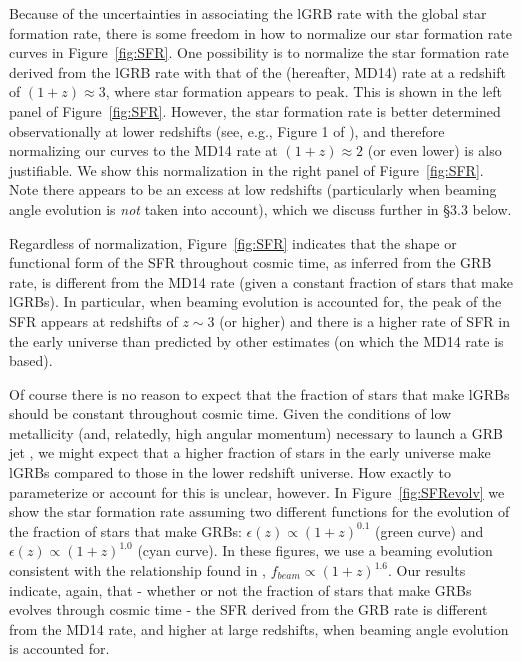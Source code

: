 \documentclass[fleqn,usenatbib,useAMS]{mnras}
\begin{document}
  Because of the uncertainties in associating the lGRB rate with the global star formation rate, there is some freedom in how to normalize our star formation rate curves in Figure~\ref{fig:SFR}. One possibility is to normalize the star formation rate derived from the lGRB rate with that of the \cite{MD14} (hereafter, MD14) rate at a redshift of $(1+z) \approx 3$, where star formation appears to peak. This is shown in the left panel of Figure~\ref{fig:SFR}.  However, the star formation rate is better determined observationally at lower redshifts (see, e.g., Figure 1 of \cite{HB06}), and therefore normalizing our curves to the MD14 rate at $(1+z) \approx 2$ (or even lower) is also justifiable.  We show this normalization in the right panel of Figure~\ref{fig:SFR}. Note there appears to be an excess at low redshifts (particularly when beaming angle evolution is {\em not} taken into account), which we discuss further in \S 3.3 below.
  
  Regardless of normalization, Figure~\ref{fig:SFR} indicates that the shape or functional form of the SFR throughout cosmic time, as inferred from the GRB rate, is different from the MD14 rate (given a constant fraction of stars that make lGRBs).  In particular, when beaming evolution is accounted for, the peak of the SFR appears at redshifts of $z \sim 3$ (or higher) and there is a higher rate of SFR in the early universe than predicted by other estimates (on which the MD14 rate is based).
  
  
  Of course there is no reason to expect that the fraction of stars that make lGRBs should be constant throughout cosmic time.  Given the conditions of low metallicity (and, relatedly, high angular momentum) necessary to launch a GRB jet \citep{MW99,YL05,HMM05,Yoon06,WH06}, we might expect that a higher fraction of stars in the early universe make lGRBs compared to those in the lower redshift universe.  How exactly to parameterize or account for this is unclear, however.  In Figure~\ref{fig:SFRevolv} we show the star formation rate assuming two different functions for the evolution of the fraction of stars that make GRBs: $\epsilon(z) \propto (1+z)^{0.1}$ (green curve) and $\epsilon(z) \propto (1+z)^{1.0}$ (cyan curve). In these figures, we use a beaming evolution consistent with the relationship found in \cite{LR19,LR20}, $f_{beam} \propto (1+z)^{1.6}$. Our results indicate, again, that - whether or not the fraction of stars that make GRBs evolves through cosmic time - the SFR derived from the GRB rate is different from the MD14 rate, and higher at large redshifts, when beaming angle evolution is accounted for.
  
\end{document}
